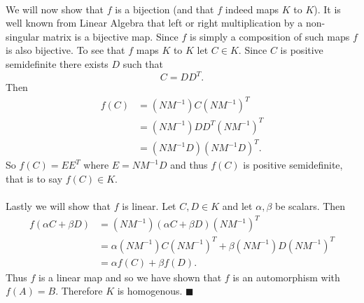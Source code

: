 \documentclass[letterpaper,12pt,oneside,onecolumn]{article}
\begin{document}
\paragraph{}
We will now show that $f$ is a bijection (and that $f$ indeed maps $K$ to $K$). It is well known from Linear Algebra that left or right multiplication by a non-singular matrix is a bijective map. Since $f$ is simply a composition of such maps $f$ is also bijective. To see that $f$ maps $K$ to $K$ let $C \in K$. Since $C$ is positive semidefinite there exists $D$ such that$$C = DD^T.$$ Then 
\begin{align*}
f(C) &= (NM^{-1})C(NM^{-1})^T \\
&= (NM^{-1})DD^T(NM^{-1})^T  \\
&= (NM^{-1}D)(NM^{-1}D)^T.
\end{align*}
So $f(C) = EE^T$ where $E = NM^{-1}D$ and thus $f(C)$ is positive semidefinite, that is to say $f(C) \in K$.
\paragraph{}
Lastly we will show that $f$ is linear. Let $C, D \in K$ and let $\alpha, \beta$ be scalars. Then
\begin{align*}
f(\alpha C + \beta D) &= (NM^{-1})(\alpha C + \beta D)(NM^{-1})^T \\
&= \alpha (NM^{-1}) C (NM^{-1})^T + \beta (NM^{-1})D(NM^{-1})^T \\
&= \alpha f(C) + \beta f(D).
\end{align*}
Thus $f$ is a linear map and so we have shown that $f$ is an automorphism with $f(A) = B$. Therefore $K$ is homogenous. $\blacksquare$
\end{document}
